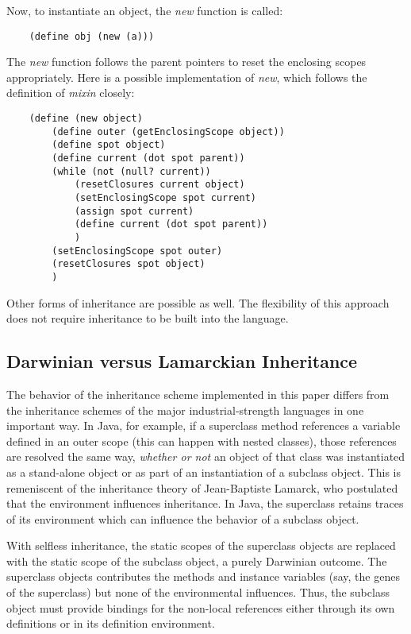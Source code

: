 Now, to instantiate an object, the {\it new} function is called:

\begin{verbatim}
    (define obj (new (a)))
\end{verbatim}

The {\it new} function follows the parent pointers to reset the enclosing
scopes appropriately. Here is a possible implementation of {\it new},
which follows the definition of {\it mixin} closely:

\begin{verbatim}
    (define (new object)
        (define outer (getEnclosingScope object))
        (define spot object)
        (define current (dot spot parent))
        (while (not (null? current))
            (resetClosures current object)
            (setEnclosingScope spot current)
            (assign spot current)
            (define current (dot spot parent))
            )
        (setEnclosingScope spot outer)
        (resetClosures spot object)
        )
\end{verbatim}

Other forms of inheritance are possible as well. The flexibility of this
approach does not require inheritance to be built into the language.

\subsection{Darwinian versus Lamarckian Inheritance}

The behavior of the inheritance scheme implemented in this paper differs
from the inheritance schemes of the major industrial-strength languages
in one important way.  In Java, for example, if a superclass method
references a variable defined in an outer scope (this can happen
with nested classes), those references are resolved the same way,
{\it whether or not} an object of that class was instantiated as a
stand-alone object or as part of an instantiation of a subclass object.
This is remeniscent of the inheritance theory of Jean-Baptiste Lamarck,
who postulated that the environment influences inheritance. In Java,
the superclass retains traces of its environment which can influence
the behavior of a subclass object.

With selfless inheritance, the static scopes of the superclass objects
are replaced with the static scope of the subclass object, a purely
Darwinian outcome. The superclass objects contributes the methods
and instance variables (say, the genes of the superclass) but none of
the environmental influences.  Thus, the subclass object must provide
bindings for the non-local references either through its own definitions
or in its definition environment.

